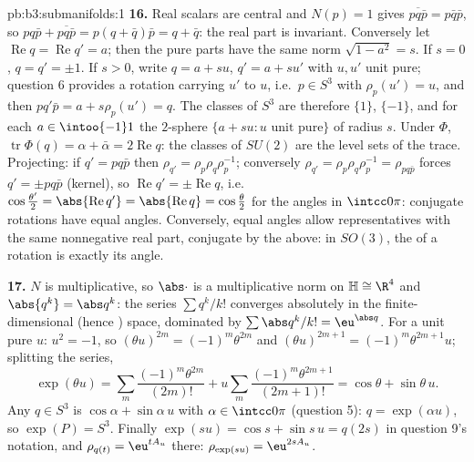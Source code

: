 \begin{solution}{pb:b3:submanifolds:1}
\textbf{16.} Real scalars are central and $N(p) = 1$ gives
$\overline{pq\bar p} = p\bar q\bar p$, so $pq\bar p +
\overline{pq\bar p} = p(q + \bar q)\bar p = q + \bar q$:
the real part is invariant. Conversely let
$\operatorname{Re}q = \operatorname{Re}q' = a$; then the
pure parts have the same norm $\sqrt{1 - a^2} = s$. If $s =
0$, $q = q' = \pm1$. If $s > 0$, write $q = a + su$, $q' =
a + su'$ with $u, u'$ unit pure; question 6 provides a
rotation carrying $u'$ to $u$, i.e.\ $p \in S^3$ with
$\rho_p(u') = u$, and then $pq'\bar p = a + s\rho_p(u') =
q$. The classes of $S^3$ are therefore $\{1\}$, $\{-1\}$,
and for each $a \in \intoo{-1}1$ the $2$-sphere $\{a + su :
u \text{ unit pure}\}$ of radius $s$. Under $\Phi$,
$\operatorname{tr}\Phi(q) = \alpha + \bar\alpha =
2\operatorname{Re}q$: the classes of $SU(2)$ are the level
sets of the trace. Projecting: if $q' = pq\bar p$ then
$\rho_{q'} = \rho_p\rho_q\rho_p^{-1}$; conversely
$\rho_{q'} = \rho_p\rho_q\rho_p^{-1} = \rho_{pq\bar p}$
forces $q' = \pm pq\bar p$ (kernel), so
$\operatorname{Re}q' = \pm\operatorname{Re}q$, i.e.\
$\cos\frac{\theta'}2 = \abs{\operatorname{Re}q'} =
\abs{\operatorname{Re}q} = \cos\frac\theta2$ for the angles
in $\intcc0\pi$: conjugate rotations have equal angles.
Conversely, equal angles allow representatives with the
same nonnegative real part, conjugate by the above: in
$SO(3)$, the  of a rotation is exactly its
angle.

\textbf{17.} $N$ is multiplicative, so $\abs\cdot$ is a
multiplicative norm on $\mathbb H \cong \R^4$ and
$\abs{q^k} = \abs q^k$: the series $\sum q^k/k!$ converges
absolutely in the finite-dimensional (hence )
space, dominated by $\sum\abs q^k/k! = \eu^{\abs q}$. For a
unit pure $u$: $u^2 = -1$, so $(\theta u)^{2m} =
(-1)^m\theta^{2m}$ and $(\theta u)^{2m+1} =
(-1)^m\theta^{2m+1}u$; splitting the series,
\[
\exp(\theta u) = \sum_m\frac{(-1)^m\theta^{2m}}{(2m)!} +
u\sum_m\frac{(-1)^m\theta^{2m+1}}{(2m+1)!} = \cos\theta +
\sin\theta\,u .
\]
Any $q \in S^3$ is $\cos\alpha + \sin\alpha\,u$ with
$\alpha \in \intcc0\pi$ (question 5): $q = \exp(\alpha u)$,
so $\exp(P) = S^3$. Finally $\exp(su) = \cos s + \sin s\,u
= q(2s)$ in question 9's notation, and $\rho_{q(t)} =
\eu^{tA_u}$ there: $\rho_{\exp(su)} = \eu^{2sA_u}$.


\end{solution}
